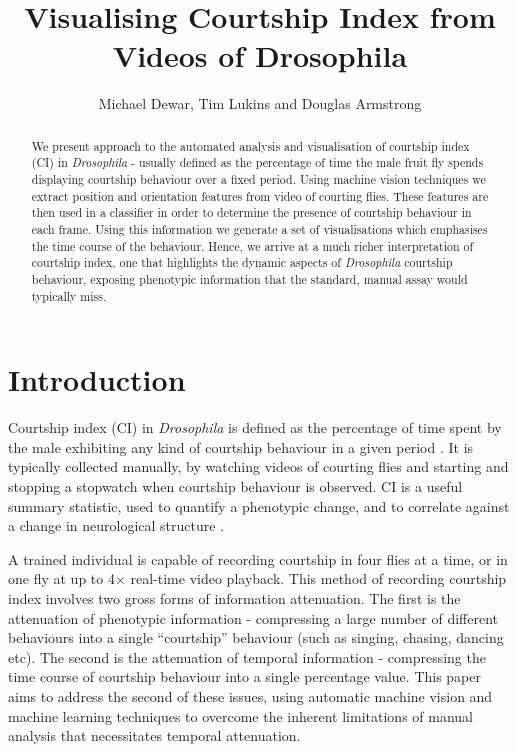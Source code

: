 \documentclass{article}
\title{Visualising Courtship Index from Videos of Drosophila}
\author{Michael Dewar, Tim Lukins and Douglas Armstrong}
\begin{document}
	
	\maketitle

	\begin{abstract}
	We present approach to the automated analysis and visualisation of courtship index (CI) in \emph{Drosophila} - usually defined as the percentage of time the male fruit fly spends displaying courtship behaviour over a fixed period. Using machine vision techniques we extract position and orientation features from video of courting flies. These features are then used in a classifier in order to determine the presence of courtship behaviour in each frame. Using this information we generate a set of visualisations which emphasises the time course of the behaviour. Hence, we arrive at a much richer interpretation of courtship index, one that highlights the dynamic aspects of \emph{Drosophila} courtship behaviour, exposing phenotypic information that the standard, manual assay would typically miss.
	\end{abstract}

\section{Introduction}

Courtship index (CI) in \emph{Drosophila} is defined as the percentage of time spent by the male exhibiting any kind of courtship behaviour in a given period \cite{}. It is typically collected manually, by watching videos of courting flies and starting and stopping a stopwatch when courtship behaviour is observed. CI is a useful summary statistic, used to quantify a phenotypic change, and to correlate against a change in neurological structure \cite{}.

A trained individual is capable of recording courtship in four flies at a time, or in one fly at up to 4$\times$ real-time video playback. This method of recording courtship index involves two gross forms of information attenuation. The first is the attenuation of phenotypic information - compressing a large number of different behaviours into a single ``courtship'' behaviour (such as singing, chasing, dancing etc). The second is the attenuation of temporal information - compressing the time course of courtship behaviour into a single percentage value. This paper aims to address the second of these issues, using automatic machine vision and machine learning techniques to overcome the inherent limitations of manual analysis that necessitates temporal attenuation.
\end{document}
